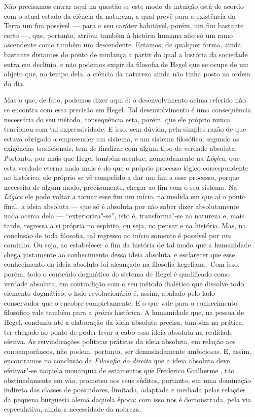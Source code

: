Não precisamos entrar aqui na questão se este modo de intuição está de
acordo com o atual estado da ciência da natureza, a qual prevê para a
existência da Terra um fim possível~--- para o seu caráter
habitável, porém, um fim bastante certo ---, que, portanto, atribui também
à história humana não só um ramo ascendente como também um descendente.
Estamos, de qualquer forma, ainda bastante distantes do ponto de mudança
a partir do qual a história da sociedade entra em declínio, e não podemos
exigir da filosofia
de Hegel que
se ocupe de um objeto que, no tempo dela, a ciência da natureza ainda
não tinha posto na ordem do dia.

Mas o que, de fato, podemos dizer aqui é: o desenvolvimento acima
referido não se encontra com essa precisão
em Hegel.
Tal desenvolvimento é uma consequência necessária do seu método,
consequência esta, porém, que ele próprio nunca tencionou com tal
expressividade. E isso, sem dúvida, pela simples razão de que estava
obrigado a empreender um sistema, e um sistema filosófico, segundo as
exigências tradicionais, tem de finalizar com algum tipo de verdade
absoluta. Portanto, por mais que Hegel também acentue, nomeadamente
na \emph{Lógica}, que esta verdade eterna
nada mais é do que o próprio processo lógico correspondente ao
histórico, ele próprio se vê compelido a dar um fim a esse processo,
porque necessita de algum modo, precisamente, chegar ao fim com o seu
sistema. Na \emph{Lógica} ele pode voltar a tornar esse fim um início,
na medida em que aí o ponto final, a ideia absoluta --- que só é absoluta por não saber dizer absolutamente nada acerca dela ---
``exterioriza"-se'', isto é, transforma"-se na 
natureza e, mais tarde, regressa a si própria no espírito, ou seja, no
pensar e na história. Mas, na conclusão de toda filosofia, tal regresso
ao início somente é possível por \emph{um} caminho. Ou seja, ao
estabelecer o fim da história de tal modo que a humanidade chega
justamente ao conhecimento dessa ideia absoluta \textbar{}\,e esclarecer que esse
conhecimento da ideia absoluta foi alcançado na filosofia hegeliana.\,\textbar{}
Com isso, porém, todo o conteúdo dogmático do sistema
de Hegel é
qualificado como verdade absoluta, em contradição com o seu método
dialético que dissolve todo elemento dogmático; o lado revolucionário é,
assim, abafado pelo lado conservador que o encobre completamente. E o
que vale para o conhecimento filosófico vale também para a
\emph{práxis} histórica. A humanidade que, na pessoa
de Hegel,
conduziu até a elaboração da ideia absoluta precisa, também na prática,
ter chegado ao ponto de poder levar a cabo essa ideia absoluta na
realidade efetiva. As reivindicações políticas práticas da ideia
absoluta, em relação aos contemporâneos, não podem, portanto, ser
demasiadamente ambiciosas. E, assim, encontramos na conclusão
da \emph{Filosofia do direito} que a ideia absoluta deve efetivar"-se
naquela monarquia de estamentos 
que Frederico Guilherme , tão obstinadamente em vão, prometeu aos seus súditos,
portanto, em uma dominação indireta das classes de possuidores,
limitada, adaptada e mediada pelas relações da pequena burguesia alemã
daquela época; com isso nos é demonstrada, pela via especulativa, ainda
a necessidade da nobreza.

